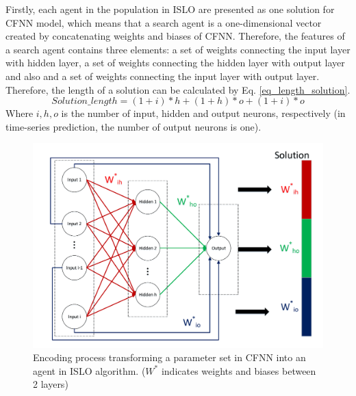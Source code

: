 \documentclass[a4paper,13pt,2p]{report}
\begin{document}
	Firstly, each agent in the population in ISLO are presented as one solution for CFNN model, which means that a search agent is a one-dimensional vector created by concatenating weights and biases of CFNN. Therefore, the features of a search agent contains three elements: a set of weights connecting the input layer with hidden layer, a set of weights connecting the hidden layer with output layer and also and a set of weights connecting the input layer with output layer. Therefore,  the length of a solution can be calculated by Eq. \ref{eq_length_solution}.	
\begin{equation} \label{eq_length_solution}
	Solution\_length = (1+i)*h + (1+h)*o + (1+i)*o
\end{equation}
Where $i, h, o$ is the number of input, hidden and output neurons,  respectively (in time-series prediction, the number of output neurons is one).
\begin{figure}[!ht] 
   \centering
   \includegraphics[width=0.75\linewidth]{pdf/model/solution_creation}
  \caption{Encoding process transforming a parameter set in CFNN into an agent in ISLO algorithm. ($W^*$ indicates weights and biases between 2 layers)} 
  \label{fig_solution_encode} 
\end{figure}
	
\end{document}
